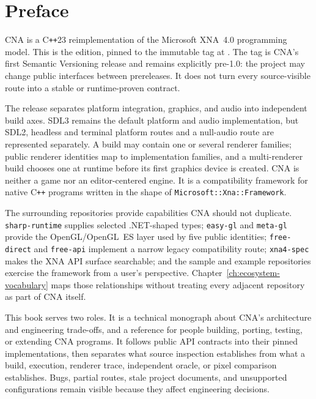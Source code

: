 \chapter*{Preface}

CNA is a C\texttt{++}23 reimplementation of the Microsoft XNA~4.0 programming model. This is the
\CnaProductVersion{} edition, pinned to the immutable \CnaEditionTag{} tag at
\CnaRevision. The tag is CNA's first Semantic Versioning release and remains explicitly
pre-1.0: the project may change public interfaces between prereleases. It does not turn every
source-visible route into a stable or runtime-proven contract.

The release separates platform integration, graphics, and audio into independent build axes.
SDL3 remains the default platform and audio implementation, but SDL2, headless and terminal
platform routes and a null-audio route are represented separately. A build may contain one or
several renderer families; \RendererIdentityCount{} public renderer identities map to
\RendererFamilyCount{} implementation families, and a multi-renderer build chooses one at
runtime before its first graphics device is created. CNA is neither a game nor an
editor-centered engine. It is a compatibility framework for native C\texttt{++} programs
written in the shape of \texttt{Microsoft::Xna::Framework}.

The surrounding repositories provide capabilities CNA should not duplicate.
\texttt{sharp-runtime} supplies selected .NET-shaped types; \texttt{easy-gl} and
\texttt{meta-gl} provide the OpenGL/OpenGL~ES layer used by five public identities;
\texttt{free-direct} and \texttt{free-api} implement a narrow legacy compatibility route;
\texttt{xna4-spec} makes the XNA API surface searchable; and the sample and example repositories
exercise the framework from a user's perspective. Chapter~\ref{ch:ecosystem-vocabulary} maps
those relationships without treating every adjacent repository as part of CNA itself.

This book serves two roles. It is a technical monograph about CNA's architecture and engineering
trade-offs, and a reference for people building, porting, testing, or extending CNA programs.
It follows public API contracts into their pinned implementations, then separates what source
inspection establishes from what a build, execution, renderer trace, independent oracle, or
pixel comparison establishes. Bugs, partial routes, stale project documents, and unsupported
configurations remain visible because they affect engineering decisions.

